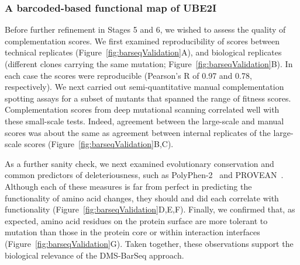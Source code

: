 \subsubsection{A barcoded-based functional map of UBE2I}

Before further refinement in Stages 5 and 6, we wished to assess the quality of complementation scores. We first examined reproducibility of scores between technical replicates (Figure~\ref{fig:barseqValidation}A), and biological replicates (different clones carrying the same mutation; Figure~\ref{fig:barseqValidation}B).  In each case the scores were reproducible (Pearson's R of 0.97 and 0.78, respectively). We next carried out semi-quantitative manual complementation spotting assays for a subset of mutants that spanned the range of fitness scores. Complementation scores from deep mutational scanning correlated well with these small-scale tests. Indeed, agreement between the large-scale and manual scores was about the same as agreement between internal replicates of the large-scale scores (Figure~\ref{fig:barseqValidation}B,C). 

As a further sanity check, we next examined evolutionary conservation and common predictors of deleteriousness, such as PolyPhen-2~\cite{adzhubei_predicting_2001} and PROVEAN~\cite{choi_predicting_2012}.  Although each of these measures is far from perfect in predicting the functionality of amino acid changes, they should and did each correlate with functionality (Figure~\ref{fig:barseqValidation}D,E,F). Finally, we confirmed that, as expected, amino acid residues on the protein surface are more tolerant to mutation than those in the protein core or within interaction interfaces (Figure~\ref{fig:barseqValidation}G).  Taken together, these observations support the biological relevance of the DMS-BarSeq approach.

